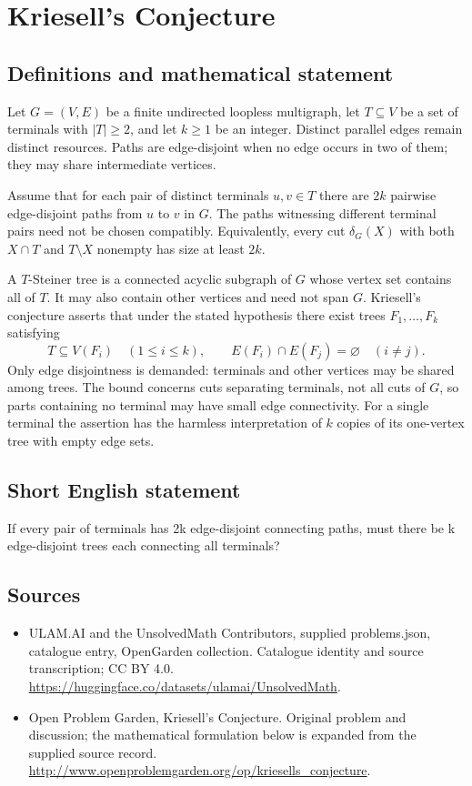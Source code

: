 \documentclass[11pt,a4paper]{article}
\begin{document}
\section*{Kriesell's Conjecture}\label{statement}

\subsection{Definitions and mathematical statement}
Let $G=(V,E)$ be a finite undirected loopless multigraph, let
$T\subseteq V$ be a set of terminals with $|T|\geq2$, and let
$k\geq1$ be an integer. Distinct parallel edges remain distinct
resources. Paths are edge-disjoint when no edge occurs in two
of them; they may share intermediate vertices.

Assume that for each pair of distinct terminals $u,v\in T$
there are $2k$ pairwise edge-disjoint paths from $u$ to $v$ in
$G$. The paths witnessing different terminal pairs need not be
chosen compatibly. Equivalently, every cut $\delta_G(X)$ with
both $X\cap T$ and $T\setminus X$ nonempty has size at least
$2k$.

A $T$-Steiner tree is a connected acyclic subgraph of $G$ whose
vertex set contains all of $T$. It may also contain other
vertices and need not span $G$. Kriesell's conjecture asserts
that under the stated hypothesis there exist trees
$F_1,\ldots,F_k$ satisfying
\[
 T\subseteq V(F_i)\quad(1\leq i\leq k),\qquad
 E(F_i)\cap E(F_j)=\varnothing\quad(i\neq j).
\]
Only edge disjointness is demanded: terminals and other vertices
may be shared among trees. The bound concerns cuts separating
terminals, not all cuts of $G$, so parts containing no terminal
may have small edge connectivity. For a single terminal the
assertion has the harmless interpretation of $k$ copies of its
one-vertex tree with empty edge sets.
\subsection{Short English statement}
If every pair of terminals has 2k edge-disjoint connecting paths, must there be k edge-disjoint trees each connecting all terminals?
\subsection{Sources}
\begin{itemize}
\item[S1] ULAM.AI and the UnsolvedMath Contributors, supplied problems.json, catalogue entry, OpenGarden collection. Catalogue identity and source transcription; CC BY 4.0.
\url{https://huggingface.co/datasets/ulamai/UnsolvedMath}.
\item[S2] Open Problem Garden, Kriesell's Conjecture. Original problem and discussion; the mathematical formulation below is expanded from the supplied source record.
\url{http://www.openproblemgarden.org/op/kriesells_conjecture}.
\end{itemize}
\end{document}
